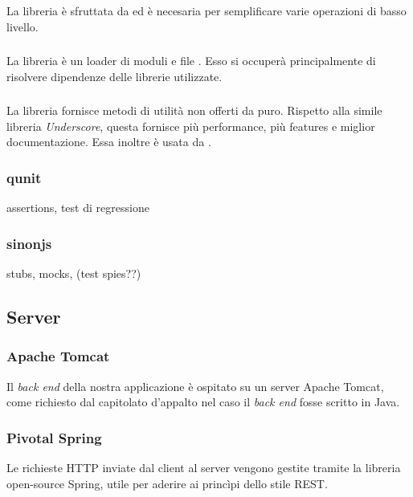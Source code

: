 \subsubsection{\jquery}
La libreria \jquery{} è sfruttata da \jointjs{} ed è necesaria per semplificare varie operazioni di basso livello.


\subsubsection{\requirejs}
La libreria \requirejs{} è un loader di moduli e file \js{}. Esso si occuperà principalmente di risolvere dipendenze delle librerie \js{} utilizzate.

\subsubsection{\lodash}
La libreria \lodash{} fornisce metodi di utilità non offerti da \js{} puro. Rispetto alla simile libreria \emph{Underscore}, questa fornisce più performance, più features e miglior documentazione. Essa inoltre è usata da \jointjs{}.


\subsubsection{qunit}
assertions, test di regressione
\subsubsection{sinonjs}
stubs, mocks, (test spies??)




\subsection{Server}


\subsubsection{Apache Tomcat}
Il \emph{back end} della nostra applicazione è ospitato su un server Apache Tomcat, come richiesto dal capitolato d'appalto nel caso il \emph{back end} fosse scritto in Java.

\subsubsection{Pivotal Spring}
Le richieste HTTP inviate dal client al server vengono gestite tramite la libreria open-source Spring, utile per aderire ai princìpi dello stile REST.

